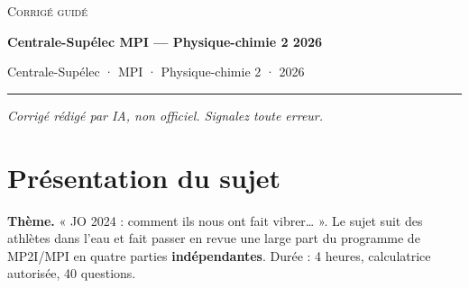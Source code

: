 \documentclass[11pt,a4paper]{article}
\begin{document}
\thispagestyle{plain}
\begin{center}
  {\small\scshape Corrigé guidé}\par\smallskip
  {\LARGE\bfseries Centrale-Supélec MPI — Physique-chimie 2 2026\par}\medskip
  {\large Centrale-Supélec · MPI · Physique-chimie 2 · 2026\par}
\end{center}
\vspace{2pt}\hrule\vspace{8pt}

\emph{Corrigé rédigé par IA, non officiel. Signalez toute erreur.}

\hypertarget{pruxe9sentation-du-sujet}{%
\section{Présentation du sujet}\label{pruxe9sentation-du-sujet}}

\textbf{Thème.} « JO 2024 : comment ils nous ont fait vibrer\ldots{} ». Le sujet suit des athlètes dans l'eau et fait passer en revue une large part du programme de MP2I/MPI en quatre parties \textbf{indépendantes}. Durée : 4 heures, calculatrice autorisée, 40 questions.
\end{document}
